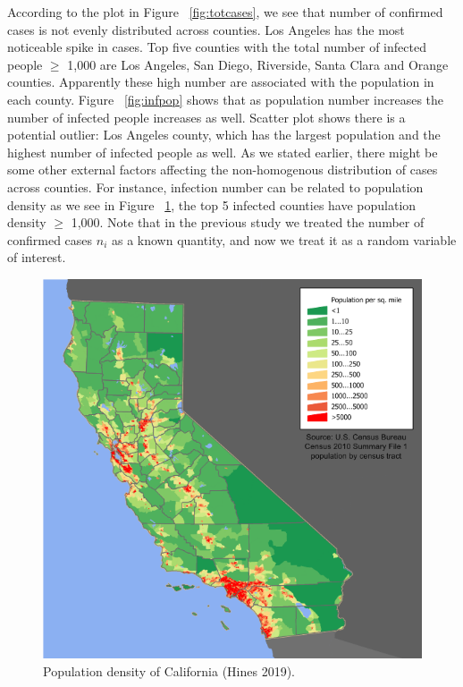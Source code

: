 \documentclass[11pt,twocolumn]{asaproc}
\begin{document}
According to the plot in Figure ~\ref{fig:totcases}, we see that number of confirmed cases is not evenly distributed across counties. Los Angeles has the most noticeable spike in cases. Top five counties with the total number of infected people $\geq$ 1,000 are Los Angeles, San Diego, Riverside, Santa Clara and Orange counties. Apparently these high number are associated with the population in each county. Figure ~\ref{fig:infpop} shows that as population number increases the number of infected people increases as well. Scatter plot shows there is a potential outlier: Los Angeles county, which has the largest population and the highest number of infected people as well. As we stated earlier, there might be some other external factors affecting the non-homogenous distribution of cases across counties. For instance, infection number can be related to population density as we see in Figure ~\ref{fig:density},  the top 5 infected counties have population density $\geq$ 1,000. Note that in the previous study we treated the number of confirmed cases $n_i$ as a known quantity, and now we treat it as a random variable of interest. 

\begin{figure}[t]
\centering\includegraphics[scale=.30]{density.png}
\caption{Population density of California (Hines 2019).}
\label{fig:density}
\end{figure}
\end{document}
